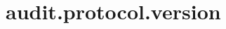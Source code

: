 \section{audit.protocol.version}
\label{configuration:AuditProtocolVersion}
\AvailableInJavaOnly{\TODO}